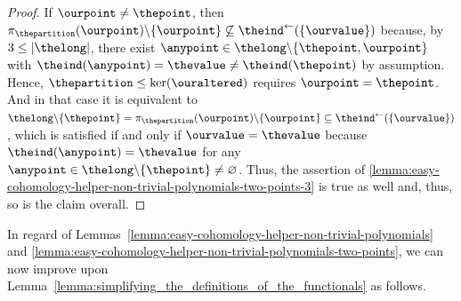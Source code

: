\documentclass[10pt,a4paper]{amsart}
\numberwithin{equation}{section}
\newcommand{\spimgx}[2]{#1^{\leftarrow}(#2)}
\newcommand{\finerthan}{\mathrel{\leq}}
\newcommand{\blo}[2]{\pi_{#1}(#2)}
\begin{document}
{\begin{proof}
      If $\ourpoint\neq \thepoint$, then $\blo{\thepartition}{\ourpoint}\backslash \{\ourpoint\}\not\subseteq\spimgx{\theind}{\{\ourvalue\}}$ because, by $3\leq |\thelong|$, there exist $\anypoint\in\thelong\backslash \{\thepoint,\ourpoint\}$ with $\theind(\anypoint)=\thevalue\neq \theind(\thepoint)$ by assumption. Hence,  $\thepartition\finerthan \ker(\ouraltered)$ requires $\ourpoint=\thepoint$. And in that case it is equivalent to $\thelong\backslash \{\thepoint\}=\blo{\thepartition}{\ourpoint}\backslash \{\ourpoint\}\subseteq\spimgx{\theind}{\{\ourvalue\}}$, which is satisfied if and only if $\ourvalue=\thevalue$ because $\theind(\anypoint)=\thevalue$ for any $\anypoint\in\thelong\backslash\{\thepoint\}\neq\varnothing$. Thus,  the assertion of  \ref{lemma:easy-cohomology-helper-non-trivial-polynomials-two-points-3}  is true as well and, thus, so is the claim overall.
  \end{proof}
 }

In regard of Lem\-mas~\ref{lemma:easy-cohomology-helper-non-trivial-polynomials} and \ref{lemma:easy-cohomology-helper-non-trivial-polynomials-two-points}, we can now improve upon Lem\-ma~\ref{lemma:simplifying_the_definitions_of_the_functionals} as follows.
\end{document}
